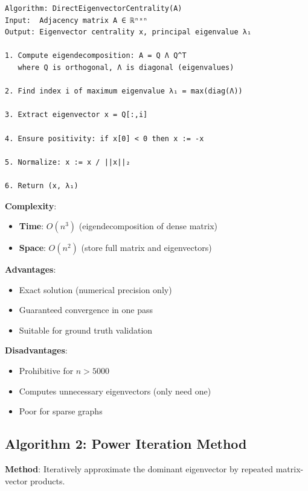 \documentclass[12pt]{article}
\begin{document}
\begin{lstlisting}
Algorithm: DirectEigenvectorCentrality(A)
Input:  Adjacency matrix A ∈ ℝⁿˣⁿ
Output: Eigenvector centrality x, principal eigenvalue λ₁

1. Compute eigendecomposition: A = Q Λ Q^T
   where Q is orthogonal, Λ is diagonal (eigenvalues)

2. Find index i of maximum eigenvalue λ₁ = max(diag(Λ))

3. Extract eigenvector x = Q[:,i]

4. Ensure positivity: if x[0] < 0 then x := -x

5. Normalize: x := x / ||x||₂

6. Return (x, λ₁)
\end{lstlisting}

\textbf{Complexity}:
\begin{itemize}
    \item \textbf{Time}: $O(n^3)$ (eigendecomposition of dense matrix)
    \item \textbf{Space}: $O(n^2)$ (store full matrix and eigenvectors)
\end{itemize}

\textbf{Advantages}:
\begin{itemize}
    \item Exact solution (numerical precision only)
    \item Guaranteed convergence in one pass
    \item Suitable for ground truth validation
\end{itemize}

\textbf{Disadvantages}:
\begin{itemize}
    \item Prohibitive for $n > 5000$
    \item Computes unnecessary eigenvectors (only need one)
    \item Poor for sparse graphs
\end{itemize}

\subsection{Algorithm 2: Power Iteration Method}

\textbf{Method}: Iteratively approximate the dominant eigenvector by repeated matrix-vector products.
\end{document}
